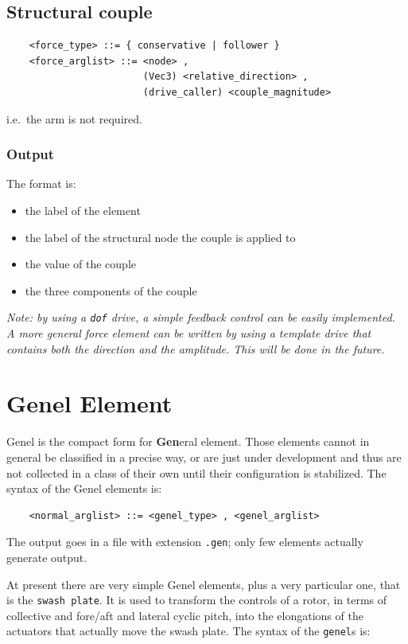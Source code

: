 \documentclass[10pt,dvips]{report}
\begin{document}
\subsection{Structural couple}
\begin{verbatim}
    <force_type> ::= { conservative | follower } 
    <force_arglist> ::= <node> ,
                        (Vec3) <relative_direction> ,  
                        (drive_caller) <couple_magnitude>
\end{verbatim}
i.e.\ the arm is not required. 

\subsubsection{Output}
The format is:
\begin{itemize}
    \item the label of the element
    \item the label of the structural node the couple is applied to
    \item the value of the couple
    \item the three components of the couple
\end{itemize}


\noindent
{\em 
Note: by using a {\tt dof} drive, a simple feedback control can be easily
implemented. \\
A more general force element can be written by using a template drive
that contains both the direction and the amplitude. This will be done in the
future. 
}





\section{Genel Element}
{\sc Genel} is the compact form for {\sc \bf Gen}eral {\sc el}ement. Those
elements cannot in general be classified in a precise way, or are just
under development and thus are not collected in a class of their own until
their configuration is stabilized. 
The syntax of the {\sc Genel} elements is:
\begin{verbatim}
    <normal_arglist> ::= <genel_type> , <genel_arglist>
\end{verbatim}

\noindent
The output goes in a file with extension {\tt .gen}; only few elements
actually generate output.

\noindent
At present there are very simple {\sc Genel}
elements, plus a very particular one, that is the {\tt swash plate}.
It is used to transform the controls of a rotor, in terms of collective
and fore/aft and lateral cyclic pitch, into the elongations of the actuators 
that actually move the swash plate.
The syntax of the {\tt genel}s is:
\end{document}
